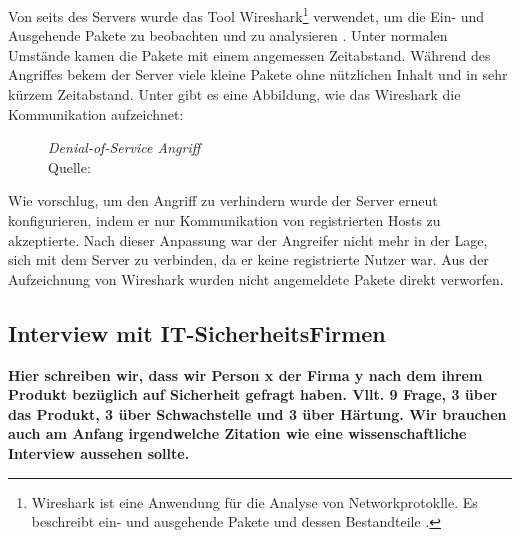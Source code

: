 Von seits des Servers wurde das Tool Wireshark\footnote{Wireshark ist eine Anwendung für die Analyse von Networkprotoklle.
Es beschreibt ein- und ausgehende Pakete und dessen Bestandteile \cite{refst:wisa}.} verwendet, um die Ein- und Ausgehende
Pakete zu beobachten und zu analysieren \cite{refart:UBEC}. Unter normalen Umstände kamen die Pakete mit einem angemessen
Zeitabstand. Während des Angriffes bekem der Server viele kleine Pakete ohne nützlichen Inhalt und in sehr kürzem Zeitabstand.
Unter gibt es eine Abbildung, wie das Wireshark die Kommunikation aufzeichnet:

\begin{figure}[H]
  \caption{\textit{Denial-of-Service Angriff}\\Quelle: \cite{refst:wisa}}
  \label{fig:refst_wisa}
\end{figure}


Wie \cite{refip:NYRS} vorschlug, um den Angriff zu verhindern wurde der Server erneut konfigurieren, indem er nur
Kommunikation von registrierten Hosts zu akzeptierte. Nach dieser Anpassung war der Angreifer nicht mehr in der Lage, 
sich mit dem Server zu verbinden, da er keine registrierte Nutzer war. Aus der Aufzeichnung von Wireshark wurden nicht 
angemeldete Pakete direkt verworfen.

\subsection{Interview mit IT-SicherheitsFirmen}

\textbf{Hier schreiben wir, dass wir Person x der Firma y nach dem ihrem Produkt bezüglich auf Sicherheit gefragt haben.
Vllt. 9 Frage, 3 über das Produkt, 3 über Schwachstelle und 3 über Härtung. Wir brauchen auch am Anfang irgendwelche Zitation
wie eine wissenschaftliche Interview aussehen sollte.}

